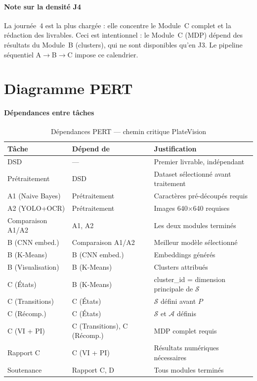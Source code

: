 \documentclass[12pt,a4paper]{article}
\begin{document}
\paragraph{Note sur la densit\'{e} J4}
La journ\'{e}e~4 est la plus charg\'{e}e : elle concentre le Module~C complet
et la r\'{e}daction des livrables. Ceci est intentionnel : le Module~C
(MDP) d\'{e}pend des r\'{e}sultats du Module~B (clusters), qui ne sont
disponibles qu'en J3. Le pipeline s\'{e}quentiel A$\to$B$\to$C impose
ce calendrier.

\section{Diagramme PERT}
\label{sec:gp:pert}

\paragraph{D\'{e}pendances entre t\^{a}ches}

\begin{table}[H]
\centering
\caption{D\'{e}pendances PERT --- chemin critique PlateVision}
\label{tab:gp:pert}
\begin{tabular}{p{4cm}p{4cm}p{5cm}}
\toprule
\textbf{T\^{a}che} & \textbf{D\'{e}pend de} & \textbf{Justification} \\
\midrule
DSD             & ---             & Premier livrable, ind\'{e}pendant \\
Pr\'{e}traitement & DSD           & Dataset s\'{e}lectionn\'{e} avant traitement \\
A1 (Naive Bayes) & Pr\'{e}traitement & Caract\`{e}res pr\'{e}-d\'{e}coup\'{e}s requis \\
A2 (YOLO+OCR)  & Pr\'{e}traitement & Images 640$\times$640 requises \\
Comparaison A1/A2 & A1, A2       & Les deux modules termin\'{e}s \\
B (CNN embed.) & Comparaison A1/A2 & Meilleur mod\`{e}le s\'{e}lectionn\'{e} \\
B (K-Means)    & B (CNN embed.) & Embeddings g\'{e}n\'{e}r\'{e}s \\
B (Visualisation) & B (K-Means) & Clusters attribu\'{e}s \\
C (\'{E}tats)  & B (K-Means)    & cluster\_id = dimension principale de $\mathcal{S}$ \\
C (Transitions) & C (\'{E}tats) & $\mathcal{S}$ d\'{e}fini avant $P$ \\
C (R\'{e}comp.) & C (\'{E}tats) & $\mathcal{S}$ et $\mathcal{A}$ d\'{e}finis \\
C (VI + PI)    & C (Transitions), C (R\'{e}comp.) & MDP complet requis \\
Rapport C      & C (VI + PI)    & R\'{e}sultats num\'{e}riques n\'{e}cessaires \\
Soutenance     & Rapport C, D   & Tous modules termin\'{e}s \\
\bottomrule
\end{tabular}
\end{table}
\end{document}
